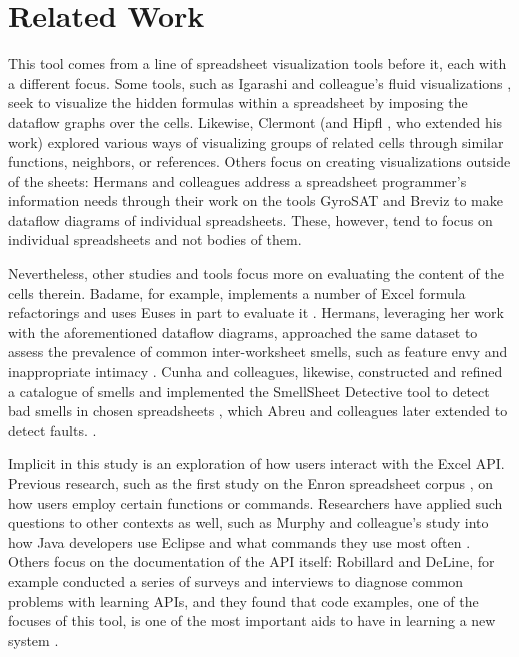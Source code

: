 \documentclass[conference]{IEEEtran}
\begin{document}
	\section{Related Work} This tool comes from a line of spreadsheet visualization
	tools before it, each with a different focus. Some tools, such as Igarashi and
	colleague's fluid visualizations \cite{igarashi1998fluid}, seek to visualize
	the hidden formulas within a spreadsheet by imposing the dataflow graphs over
	the cells. Likewise, Clermont \cite{clermont2003scalable} (and Hipfl
	\cite{hipfl2008using}, who extended his work) explored various ways of
	visualizing groups of related cells through similar functions, neighbors, or
	references. Others focus on creating visualizations outside of the sheets:
	Hermans and colleagues address a spreadsheet programmer's information needs
	through their work on the tools GyroSAT \cite{hermans2011supporting} and Breviz
	\cite{hermans2011breviz} to make dataflow diagrams of individual spreadsheets.
	These, however, tend to focus on individual spreadsheets and not bodies of
	them. \par Nevertheless, other studies and tools focus more on evaluating the
	content of the cells therein. Badame, for example, implements a number of Excel
	formula refactorings and uses Euses in part to evaluate it
	\cite{badame2012refactoring}. Hermans, leveraging her work with the
	aforementioned dataflow diagrams, approached the same dataset to assess the
	prevalence of common inter-worksheet smells, such as feature envy and
	inappropriate intimacy \cite{hermans2012detecting}. Cunha and colleagues,
	likewise, constructed and refined a catalogue of smells and implemented the
	SmellSheet Detective tool to detect bad smells in chosen spreadsheets
	\cite{cunha2012towards}, which Abreu and colleagues later extended to detect
	faults. \cite{abreu2014smelling}.\par Implicit in this study is an exploration
	of how users interact with the Excel API. Previous research, such as the first
	study on the Enron spreadsheet corpus \cite{hermans2015enron}, on how users
	employ certain functions or commands. Researchers have applied such questions
	to other contexts as well, such as Murphy and colleague's study into how Java
	developers use Eclipse and what commands they use most often
	\cite{murphy2006java}.  Others focus on the documentation of the API itself:
	Robillard and DeLine, for example conducted a series of surveys and interviews
	to diagnose common problems with learning APIs, and they found that code
	examples, one of the focuses of this tool, is one of the most important aids to
	have in learning a new system \cite{robillard2011field}.
	
\end{document}
